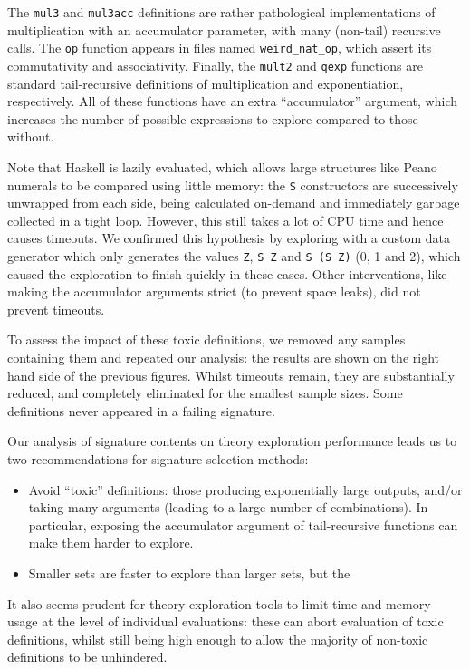 The \texttt{mul3} and \texttt{mul3acc} definitions are rather pathological
implementations of multiplication with an accumulator parameter, with many
(non-tail) recursive calls. The \texttt{op} function appears in files named
\texttt{weird\_nat\_op}, which assert its commutativity and associativity.
Finally, the \texttt{mult2} and \texttt{qexp} functions are standard
tail-recursive definitions of multiplication and exponentiation, respectively.
All of these functions have an extra ``accumulator'' argument, which increases
the number of possible expressions to explore compared to those without.

Note that Haskell is lazily evaluated, which allows large structures like Peano
numerals to be compared using little memory: the \texttt{S} constructors are
successively unwrapped from each side, being calculated on-demand and
immediately garbage collected in a tight loop. However, this still takes a lot
of CPU time and hence causes timeouts. We confirmed this hypothesis by exploring
with a custom data generator which only generates the values \texttt{Z},
\texttt{S Z} and \texttt{S (S Z)} (0, 1 and 2), which caused the exploration to
finish quickly in these cases. Other interventions, like making the accumulator
arguments strict (to prevent space leaks), did not prevent timeouts.

To assess the impact of these toxic definitions, we removed any samples
containing them and repeated our analysis: the results are shown on the right
hand side of the previous figures. Whilst timeouts remain, they are
substantially reduced, and completely eliminated for the smallest sample sizes.
Some definitions never appeared in a failing signature.

Our analysis of signature contents on theory exploration performance leads us to
two recommendations for signature selection methods:

\begin{itemize}
\item Avoid ``toxic'' definitions: those producing exponentially large outputs,
  and/or taking many arguments (leading to a large number of combinations). In
  particular, exposing the accumulator argument of tail-recursive functions can
  make them harder to explore.
\item Smaller sets are faster to explore than larger sets, but the
\end{itemize}

It also seems prudent for theory exploration tools to limit time and memory
usage at the level of individual evaluations: these can abort evaluation of
toxic definitions, whilst still being high enough to allow the majority of
non-toxic definitions to be unhindered.


